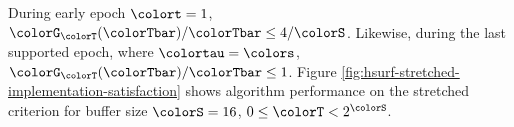 

During early epoch $\colort = 1$, $\colorG_{\colorT}(\colorTbar)/\colorTbar \leq 4/\colorS$.
Likewise, during the last supported epoch, where $\colortau = \colors$, $\colorG_{\colorT}(\colorTbar)/\colorTbar \leq 1$.
Figure \ref{fig:hsurf-stretched-implementation-satisfaction} shows algorithm performance on the stretched criterion for buffer size $\colorS=16$, $0 \leq \colorT < 2^{\colorS}$.




